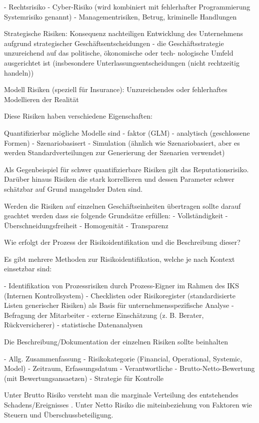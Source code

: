 - Rechtsrisiko
- Cyber-Risiko (wird kombiniert mit fehlerhafter Programmierung Systemrisiko genannt)
- Managementrisiken, Betrug, kriminelle Handlungen

Strategische Risiken:
Konsequenz nachteiligen Entwicklung des Unternehmens aufgrund strategischer Geschäftsentscheidungen
- die Geschäftsstrategie unzureichend auf das politische, ökonomische oder tech-
nologische Umfeld ausgerichtet ist (insbesondere Unterlassungsentscheidungen (nicht rechtzeitig handeln))

Modell Risiken (speziell für Insurance):
Unzureichendes oder fehlerhaftes Modellieren der Realität 

Diese Risiken haben verschiedene Eigenschaften:

Quantifizierbar
mögliche Modelle sind
- faktor (GLM)
- analytisch (geschlossene Formen)
- Szenariobasisert
- Simulation (ähnlich wie Szenariobasiert, aber es werden Standardverteilungen zur Generierung der Szenarien verwendet)

Als Gegenbeispiel für schwer quantifizierbare Risiken gilt das Reputationsrisiko. Darüber hinaus Risiken die stark korrellieren
und dessen Parameter schwer schätzbar auf Grund mangelnder Daten sind.

Werden die Risiken auf einzelnen Geschäftseinheiten übertragen sollte darauf geachtet werden dass sie folgende
Grundsätze erfüllen:
- Vollständigkeit
- Überschneidungsfreiheit
- Homogenität
- Transparenz



Wie erfolgt der Prozess der Risikoidentifikation und die Beschreibung dieser?


Es gibt mehrere Methoden zur Risikoidentifikation, welche je nach Kontext einsetzbar sind:

- Identifikation von Prozessrisiken durch Prozess-Eigner im Rahmen des IKS (Internen Kontrollsystem)
- Checklisten oder Risikoregister (standardisierte Listen generischer Risiken) als
Basis für unternehmensspezifische Analyse
- Befragung der Mitarbeiter
- externe Einschätzung (z. B. Berater, Rückversicherer)
- statistische Datenanalysen

Die Beschreibung/Dokumentation der einzelnen Risiken sollte beinhalten

- Allg. Zusammenfassung
- Risikokategorie (Financial, Operational, Systemic, Model)
- Zeitraum, Erfassungsdatum
- Verantwortliche
- Brutto-Netto-Bewertung (mit Bewertungsansaetzen)
- Strategie für Kontrolle 

Unter Brutto Risiko versteht man die marginale Verteilung des entstehendes Schadens/Ereignisses .
Unter Netto Risiko die miteinbeziehung von Faktoren wie Steuern und Überschussbeteiligung.



